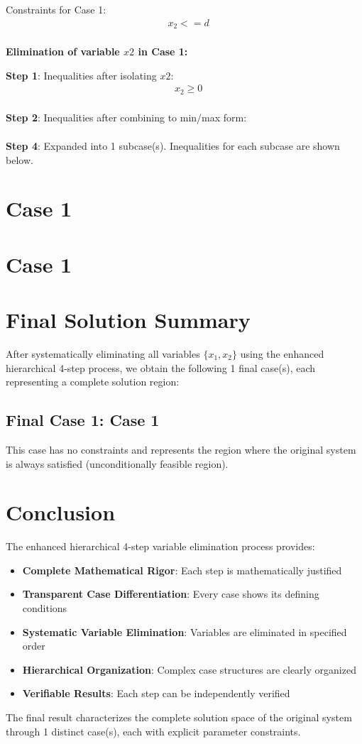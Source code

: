 \documentclass{article}
\begin{document}
Constraints for Case 1:
\begin{align}
& x_{2} <= d \\
\end{align}

\textbf{Elimination of variable $x2$ in Case 1:}

\textbf{Step 1}: Inequalities after isolating $x2$:
\begin{align}
& x_{2} \geq 0 \\
\end{align}

\textbf{Step 2}: Inequalities after combining to min/max form:
\begin{align}
\end{align}

\textbf{Step 4}: Expanded into 1 subcase(s). Inequalities for each subcase are shown below.

\section{Case 1}

\section{Case 1}

\section{Final Solution Summary}

After systematically eliminating all variables $\{x_{1}, x_{2}\}$
using the enhanced hierarchical 4-step process, we obtain the following
1 final case(s), each representing a complete solution region:

\subsection{Final Case 1: Case 1}

This case has no constraints and represents the region where the original
system is always satisfied (unconditionally feasible region).

\section{Conclusion}

The enhanced hierarchical 4-step variable elimination process provides:
\begin{itemize}
\item \textbf{Complete Mathematical Rigor}: Each step is mathematically justified
\item \textbf{Transparent Case Differentiation}: Every case shows its defining conditions
\item \textbf{Systematic Variable Elimination}: Variables are eliminated in specified order
\item \textbf{Hierarchical Organization}: Complex case structures are clearly organized
\item \textbf{Verifiable Results}: Each step can be independently verified
\end{itemize}

The final result characterizes the complete solution space of the original system
through 1 distinct case(s), each with explicit parameter constraints.
\end{document}
